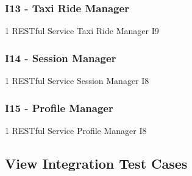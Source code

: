 \subsubsection{I13 - Taxi Ride Manager}
\testCaseSimpleSimple
	{1}
	{RESTful Service}
	{Taxi Ride Manager}
	{I9}
\subsubsection{I14 - Session Manager}
\testCaseSimpleSimple
	{1}
	{RESTful Service}
	{Session Manager}
	{I8}
\subsubsection{I15 - Profile Manager}
\testCaseSimpleSimple
	{1}
	{RESTful Service}
	{Profile Manager}
	{I8}
\subsection{View Integration Test Cases}